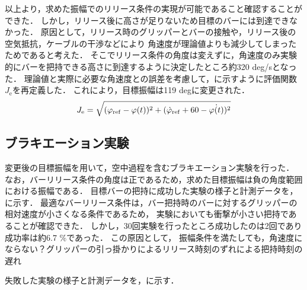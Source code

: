           以上より，求めた振幅でのリリース条件の実現が可能であること確認することができた．
          しかし，リリース後に高さが足りないため目標のバーには到達できなかった．
          原因として，リリース時のグリッパーとバーの接触や，リリース後の空気抵抗，ケーブルの干渉などにより
          角速度が理論値よりも減少してしまったためであると考えた．
          そこでリリース条件の角度は変えずに，角速度のみ実験的にバーを把持できる高さに到達するように決定したところ約320 deg/sとなった．
          理論値と実際に必要な角速度との誤差を考慮して，に示すように評価関数$J_{\mathrm{e}}$を再定義した．
          これにより，目標振幅は119 degに変更された．
          \begin{eqnarray}
            \equlabel{error2}
            J_{\mathrm{e}}=\sqrt{(\varphi_{\mathrm{ref}}-\varphi(t))^2+(\dot{\varphi}_{\mathrm{ref}}+60-\dot{\varphi(t)})^2}
          \end{eqnarray}
          
          \subsection{ブラキエーション実験}
          変更後の目標振幅を用いて，空中過程を含むブラキエーション実験を行った．
          なお，バーリリース条件の角度は正であるため，求めた目標振幅は負の角度範囲における振幅である．
          目標バーの把持に成功した実験の様子と計測データを\figref{}，\figref{}に示す．
          最適なバーリリース条件は，バー把持時のバーに対するグリッパーの相対速度が小さくなる条件であるため，
          実験においても衝撃が小さい把持であることが確認できた．
          しかし，30回実験を行ったところ成功したのは2回であり成功率は約6.7 $\%$であった．
          この原因として，
          振幅条件を満たしても，角速度にならない？グリッパーの引っ掛かりによるリリース時刻のずれによる把持時刻の遅れ

          失敗した実験の様子と計測データを\figref{}，\figref{}に示す．
          

          \newpage




